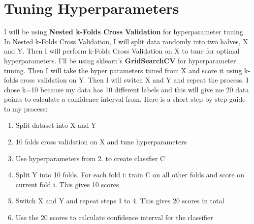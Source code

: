 \documentclass[12pt]{article}
\begin{document}
\section{Tuning Hyperparameters}
\label{tuning}
I will be using \textbf{Nested k-Folds Cross Validation} for hyperparameter tuning. In Nested k-Folds Cross Validation, I will split data randomly into two halves, X and Y. Then I will perform k-Folds Cross Validation on X to tune for optimal hyperparameters. I'll be using sklearn's \textbf{GridSearchCV} for hyperparameter tuning. Then I will take the hyper parameters tuned from X and score it using k-folds cross validation on Y. Then I will switch X and Y and repeat the process. I chose k=10 because my data has 10 different labels and this will give me 20 data points to calculate a confidence interval from. Here is a short step by step guide to my process:
\begin{enumerate}
    \item Split dataset into X and Y
    \item 10 folds cross validation on X and tune hyperparameters
    \item Use hyperparameters from 2. to create classfier C
    \item Split Y into 10 folds. For each fold i: train C on all other folds and score on current fold i. This gives 10 scores
    \item Switch X and Y and repeat steps 1 to 4. This gives 20 scores in total
    \item Use the 20 scores to calculate confidence interval for the classifier
\end{enumerate}
\end{document}
